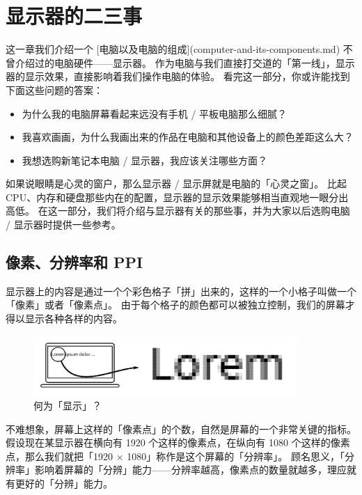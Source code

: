 \chapter{显示器的二三事}
\label{screens-and-their-secrets}

\begin{intro}
  这一章我们介绍一个 [电脑以及电脑的组成](computer-and-its-components.md) 不曾介绍过的电脑硬件——显示器。
  作为电脑与我们直接打交道的「第一线」，显示器的显示效果，直接影响着我们操作电脑的体验。
  看完这一部分，你或许能找到下面这些问题的答案：
  \begin{itemize}
    \item 为什么我的电脑屏幕看起来远没有手机 / 平板电脑那么细腻？
    \item 我喜欢画画，为什么我画出来的作品在电脑和其他设备上的颜色差距这么大？
    \item 我想选购新笔记本电脑 / 显示器，我应该关注哪些方面？
  \end{itemize}
\end{intro}

如果说眼睛是心灵的窗户，那么显示器 / 显示屏就是电脑的「心灵之窗」。
比起 CPU、内存和硬盘那些内在的配置，显示器的显示效果能够相当直观地一眼分出高低。
在这一部分，我们将介绍与显示器有关的那些事，并为大家以后选购电脑 / 显示器时提供一些参考。

\section{像素、分辨率和 PPI}

显示器上的内容是通过一个个彩色格子「拼」出来的，这样的一个小格子叫做一个「像素」或者「像素点」。
由于每个格子的颜色都可以被独立控制，我们的屏幕才得以显示各种各样的内容。

\begin{figure}[htb!]
  \centering
  \includegraphics[width=10cm]{assets/Display.png}
  \caption{何为「显示」？}
  \label{Display}
\end{figure}

不难想象，屏幕上这样的「像素点」的个数，自然是屏幕的一个非常关键的指标。
假设现在某显示器在横向有 1920 个这样的像素点，在纵向有 1080 个这样的像素点，那么我们就把「1920 × 1080」称作是这个屏幕的「分辨率」。
顾名思义，「分辨率」影响着屏幕的「分辨」能力——分辨率越高，像素点的数量就越多，理应就有更好的「分辨」能力。


